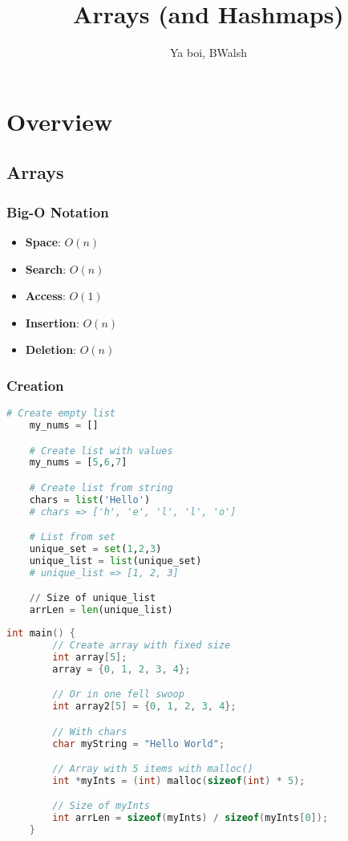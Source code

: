 \documentclass[12pt, letterpaper]{report}
\title{\textbf{Arrays (and Hashmaps)}}
\author{Ya boi, BWalsh }
\begin{document}
\maketitle

\tableofcontents

\chapter{Overview}

\section{Arrays}
\subsection{Big-O Notation}
\begin{itemize}
    \item \textbf{Space}: \(O(n)\)
    \item \textbf{Search}: \(O(n)\)
    \item \textbf{Access}: \(O(1)\)
    \item \textbf{Insertion}: \(O(n)\)
    \item \textbf{Deletion}: \(O(n)\)
\end{itemize}

\subsection{Creation}

\begin{lstlisting}[language=Python,caption={Arrays in Python}]
    # Create empty list
    my_nums = []

    # Create list with values
    my_nums = [5,6,7]

    # Create list from string
    chars = list('Hello')
    # chars => ['h', 'e', 'l', 'l', 'o']

    # List from set
    unique_set = set(1,2,3)
    unique_list = list(unique_set)
    # unique_list => [1, 2, 3]

    // Size of unique_list
    arrLen = len(unique_list)
\end{lstlisting}

\pagebreak

\begin{lstlisting}[language=C,caption={Arrays in C}]
    int main() {
        // Create array with fixed size
        int array[5];
        array = {0, 1, 2, 3, 4};

        // Or in one fell swoop
        int array2[5] = {0, 1, 2, 3, 4};

        // With chars
        char myString = "Hello World";

        // Array with 5 items with malloc()
        int *myInts = (int) malloc(sizeof(int) * 5);

        // Size of myInts
        int arrLen = sizeof(myInts) / sizeof(myInts[0]);
    }
    
\end{lstlisting}
\end{document}
